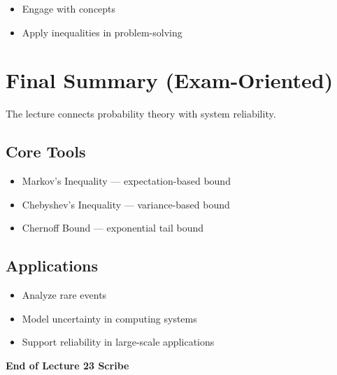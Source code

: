 \documentclass[12pt]{article}
\begin{document}
\begin{itemize}
\item Engage with concepts
\item Apply inequalities in problem-solving
\end{itemize}

\section{Final Summary (Exam-Oriented)}

The lecture connects probability theory with system reliability.

\subsection{Core Tools}

\begin{itemize}
\item Markov's Inequality --- expectation-based bound
\item Chebyshev's Inequality --- variance-based bound
\item Chernoff Bound --- exponential tail bound
\end{itemize}

\subsection{Applications}

\begin{itemize}
\item Analyze rare events
\item Model uncertainty in computing systems
\item Support reliability in large-scale applications
\end{itemize}

\vspace{0.5cm}

\begin{center}
\textbf{End of Lecture 23 Scribe}
\end{center}
\end{document}
